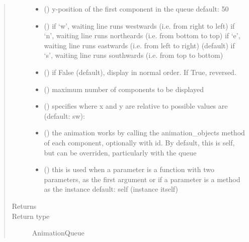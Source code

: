 \documentclass[letterpaper,10pt,english]{sphinxmanual}
\begin{document}
\begin{fulllineitems}
\begin{fulllineitems}
\begin{quote}
\begin{description}
\begin{itemize}
\item {} 
 () \textendash{} y-position of the first component in the queue 
default: 50

\item {} 
 () \textendash{} if ‘w’, waiting line runs westwards (i.e. from right to left) 
if ‘n’, waiting line runs northeards (i.e. from bottom to top) 
if ‘e’, waiting line runs eastwards (i.e. from left to right) (default) 
if ‘s’, waiting line runs southwards (i.e. from top to bottom)

\item {} 
 () \textendash{} if False (default), display in normal order. If True, reversed.

\item {} 
 () \textendash{} maximum number of components to be displayed

\item {} 
 () \textendash{} specifies where x and y are relative to 
possible values are (default: sw): 

\item {} 
 () \textendash{} the animation works by calling the animation\_objects method of each component, optionally
with id. By default, this is self, but can be overriden, particularly with the queue

\item {} 
 () \textendash{} this is used when a parameter is a function with two parameters, as the first argument or
if a parameter is a method as the instance 
default: self (instance itself)

\end{itemize}

\item[{Returns}] \leavevmode
{}

\item[{Return type}] \leavevmode
AnimationQueue

\end{description}\end{quote}


\end{fulllineitems}
\end{fulllineitems}
\end{document}
